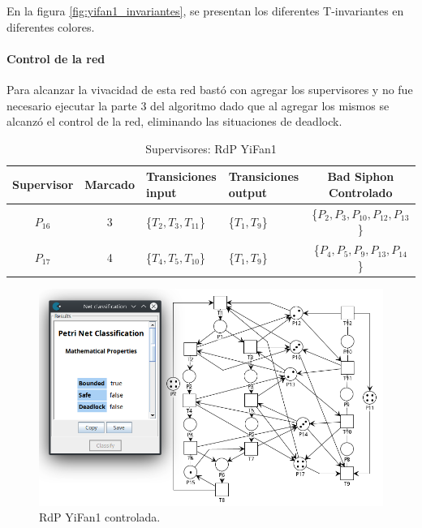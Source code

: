 En la figura \ref{fig:yifan1_invariantes}, se presentan los diferentes T-invariantes en diferentes colores. \\

\paragraph{Control de la red}
\hfill \break
Para alcanzar la vivacidad de esta red bastó con agregar los supervisores y no fue necesario ejecutar la parte 3 del algoritmo dado que al agregar los mismos se alcanzó el control de la red, eliminando las situaciones de deadlock.

\bigskip
\begin{table}[H]
    \small
    \centering
    \begin{tabular}{|c|c|P{2cm}|P{2.3cm}|c|}
    \hline
    \textbf{Supervisor} & \textbf{Marcado} & \textbf{Transiciones input} & \textbf{Transiciones output} & \textbf{Bad Siphon Controlado}  \\  \hline
    $P_{16}$ & 3 & \{$T_{2},T_{3},T_{11}$\} & \{$T_{1},T_{9}$\} & \{$P_2, P_3, P_{10}, P_{12}, P_{13}$\} \\ 
    \hline
    $P_{17}$ & 4 & \{$T_{4}, T_{5}, T_{10}$\} & \{$T_1,T_9$\} & \{$P_4, P_5, P_{9}, P_{13}, P_{14}$\} \\ 
    \hline
    \end{tabular}
    \caption{Supervisores: RdP YiFan1}
    \label{tab:Yifan1}
\end{table}
\hfill

\begin{figure}[H]
	\centering
	\includegraphics[width=\textwidth]{Figures/testing/yifan1_controlada.png}
	\caption[RdP YiFan1 controlada]{RdP YiFan1 controlada.}
	\label{fig:yifan1controlada}
 \end{figure}
 
